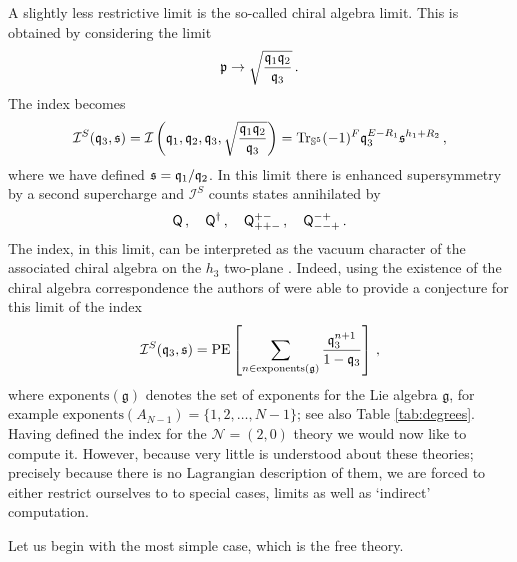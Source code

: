 \documentclass[main.tex]{subfiles}
\begin{document}
A slightly less restrictive limit is the so-called chiral algebra limit.  This is obtained by considering the limit
\begin{equation}\label{eqn:6dchiralalglim}
\mathfrak{p}\to\sqrt{\frac{\mathfrak{q}_1\mathfrak{q}_2}{\mathfrak{q}_3}}\,.
\end{equation}
The index becomes
\begin{equation}
\mathcal{I}^S(\mathfrak{q}_3,\mathfrak{s})=\mathcal{I}\left(\mathfrak{q}_1,\mathfrak{q}_2,\mathfrak{q}_3,\sqrt{\frac{\mathfrak{q}_1\mathfrak{q}_2}{\mathfrak{q}_3}}\right)=\operatorname{Tr}_{\mathbb{S}^5}(-1)^F\mathfrak{q}_3^{E-R_1}\mathfrak{s}^{h_1+R_2}\,,
\end{equation}
where we have defined $\mathfrak{s}=\mathfrak{q}_1/\mathfrak{q}_2$.  In this limit there is enhanced supersymmetry by a second supercharge and $\mathcal{I}^S$ counts states annihilated by
\begin{equation}
\mathsf{Q}\,,\quad \mathsf{Q}^{\dagger}\,,\quad \mathsf{Q}^{+-}_{++-}\,,\quad \mathsf{Q}^{-+}_{--+}\,.
\end{equation}
The index, in this limit, can be interpreted as the vacuum character of the associated chiral algebra on the $h_3$ two-plane \cite{Beem:2014kka}.  Indeed, using the existence of the chiral algebra correspondence the authors of \cite{Beem:2014kka} were able to provide a conjecture for this limit of the index
\begin{equation}\label{eqn:introchiralschurconj}
\mathcal{I}^S(\mathfrak{q}_3,\mathfrak{s})=\operatorname{\mathrm{PE}}\left[\sum_{n\in\text{exponents}(\mathfrak{g})}\frac{\mathfrak{q}_3^{n+1}}{1-\mathfrak{q}_3}\right]\,,
\end{equation}
where $\text{exponents}(\mathfrak{g})$ denotes the set of exponents for the Lie algebra $\mathfrak{g}$, for example $\text{exponents}(A_{N-1})=\{1,2,\dots,N-1\}$; see also Table \ref{tab:degrees}. 
Having defined the index for the $\mathcal{N}=(2,0)$ theory we would now like to compute it.  However, because very little is understood about these theories; precisely because there is no Lagrangian description of them, we are forced to either restrict ourselves to to special cases, limits as well as `indirect' computation.  

Let us begin with the most simple case, which is the free theory.  
\end{document}
